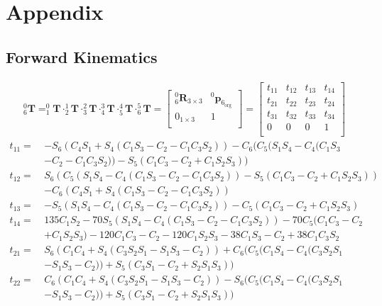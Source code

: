 \chapter{Appendix}
\section{Forward Kinematics}\label{appendix:forward}
\begin{equation*}
\begin{split}
^0_6 \mathbf{T} =
^0_1 \mathbf{T} \cdot ^1_2 \mathbf{T} \cdot ^2_3 \mathbf{T} \cdot ^3_4 \mathbf{T} \cdot ^4_5 \mathbf{T} \cdot ^5_6 \mathbf{T} =
\begin{bmatrix}
^0_6 \mathbf{R}_{3\times 3} 	&^0\!\boldsymbol{p}_\mathrm{6_{org}}\\
0_{1\times 3}				&1\\
\end{bmatrix}
=
\begin{bmatrix}
t_{11} 	&t_{12}	&t_{13}	& t_{14}\\
t_{21} 	&t_{22}	&t_{23}	& t_{24}\\
t_{31} 	&t_{32}	&t_{33}	& t_{34}\\
0					&0					&0					&1\\
\end{bmatrix}
\end{split}
\end{equation*}
\begin{equation*}
\begin{split}
t_{11} =\	&- S_6(C_4S_1 + S_4(C_1S_3-C_2 - C_1C_3S_2)) - C_6(C_5(S_1S_4 - C_4(C_1S_3\\
			&-C_2 - C_1C_3S_2)) - S_5(C_1C_3-C_2 + C_1S_2S_3))\\
t_{12} =\ 	&S_6(C_5(S_1S_4 - C_4(C_1S_3-C_2 - C_1C_3S_2)) - S_5(C_1C_3-C_2 + C_1S_2S_3))\\
		 	&- C_6(C_4S_1 + S_4(C_1S_3-C_2 - C_1C_3S_2))\\
t_{13} =\ 	&- S_5(S_1S_4 - C_4(C_1S_3-C_2 - C_1C_3S_2)) - C_5(C_1C_3-C_2 + C_1S_2S_3)\\
t_{14} =\ 	&135C_1S_2 - 70S_5(S_1S_4 - C_4(C_1S_3-C_2 - C_1C_3S_2)) - 70C_5(C_1C_3-C_2\\
		 	& + C_1S_2S_3) - 120C_1C_3-C_2 - 120C_1S_2S_3 - 38C_1S_3-C_2 + 38C_1C_3S_2\\
t_{21} =\ 	&S_6(C_1C_4 + S_4(C_3S_2S_1 - S_1S_3-C_2)) + C_6(C_5(C_1S_4 - C_4(C_3S_2S_1\\
		 	& - S_1S_3-C_2)) + S_5(C_3S_1-C_2 + S_2S_1S_3))\\
t_{22} =\ 	&C_6(C_1C_4 + S_4(C_3S_2S_1 - S_1S_3-C_2)) - S_6(C_5(C_1S_4 - C_4(C_3S_2S_1\\
		 	& - S_1S_3-C_2)) + S_5(C_3S_1-C_2 + S_2S_1S_3))\\
\end{split}
\end{equation*}
